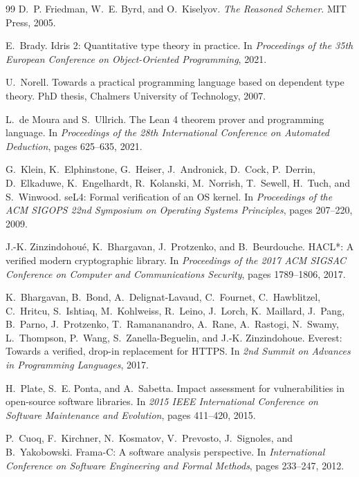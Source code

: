 \documentclass[11pt,twocolumn]{article}
\begin{document}
\begin{thebibliography}{99}
D.~P. Friedman, W.~E. Byrd, and O.~Kiselyov.
\newblock \emph{The Reasoned Schemer}.
\newblock MIT Press, 2005.

E.~Brady.
\newblock Idris 2: Quantitative type theory in practice.
\newblock In \emph{Proceedings of the 35th European Conference on Object-Oriented Programming}, 2021.

U.~Norell.
\newblock Towards a practical programming language based on dependent type theory.
\newblock PhD thesis, Chalmers University of Technology, 2007.

L.~de Moura and S.~Ullrich.
\newblock The Lean 4 theorem prover and programming language.
\newblock In \emph{Proceedings of the 28th International Conference on Automated Deduction}, pages 625--635, 2021.

G.~Klein, K.~Elphinstone, G.~Heiser, J.~Andronick, D.~Cock, P.~Derrin, D.~Elkaduwe, K.~Engelhardt, R.~Kolanski, M.~Norrish, T.~Sewell, H.~Tuch, and S.~Winwood.
\newblock seL4: Formal verification of an OS kernel.
\newblock In \emph{Proceedings of the ACM SIGOPS 22nd Symposium on Operating Systems Principles}, pages 207--220, 2009.

J.-K. Zinzindohou\'{e}, K.~Bhargavan, J.~Protzenko, and B.~Beurdouche.
\newblock HACL*: A verified modern cryptographic library.
\newblock In \emph{Proceedings of the 2017 ACM SIGSAC Conference on Computer and Communications Security}, pages 1789--1806, 2017.

K.~Bhargavan, B.~Bond, A.~Delignat-Lavaud, C.~Fournet, C.~Hawblitzel, C.~Hritcu, S.~Ishtiaq, M.~Kohlweiss, R.~Leino, J.~Lorch, K.~Maillard, J.~Pang, B.~Parno, J.~Protzenko, T.~Ramananandro, A.~Rane, A.~Rastogi, N.~Swamy, L.~Thompson, P.~Wang, S.~Zanella-Beguelin, and J.-K. Zinzindohoue.
\newblock Everest: Towards a verified, drop-in replacement for HTTPS.
\newblock In \emph{2nd Summit on Advances in Programming Languages}, 2017.

H.~Plate, S.~E. Ponta, and A.~Sabetta.
\newblock Impact assessment for vulnerabilities in open-source software libraries.
\newblock In \emph{2015 IEEE International Conference on Software Maintenance and Evolution}, pages 411--420, 2015.

P.~Cuoq, F.~Kirchner, N.~Kosmatov, V.~Prevosto, J.~Signoles, and B.~Yakobowski.
\newblock Frama-C: A software analysis perspective.
\newblock In \emph{International Conference on Software Engineering and Formal Methods}, pages 233--247, 2012.


\end{thebibliography}
\end{document}
